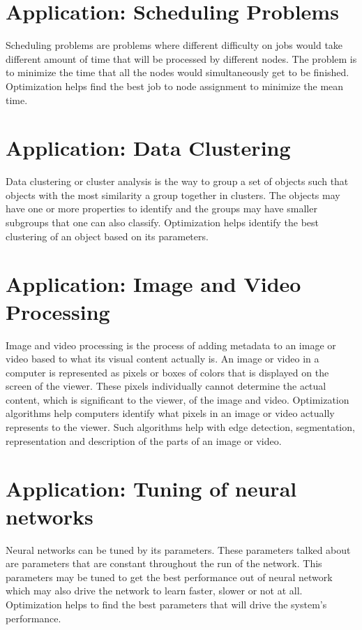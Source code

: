 \section{Application: Scheduling Problems}
Scheduling problems are problems where different difficulty on jobs would take different amount of time that will be processed by different nodes. The problem is to minimize the time that all the nodes would simultaneously get to be finished. Optimization helps find the best job to node assignment to minimize the mean time.

\section{Application: Data Clustering}
Data clustering or cluster analysis is the way to group a set of objects such that objects with the most similarity a group together in clusters. The objects may have one or more properties to identify and the groups may have smaller subgroups that one can also classify. Optimization helps identify the best clustering of an object based on its parameters.

\section{Application: Image and Video Processing}
Image and video processing is the process of adding metadata to an image or video based to what its visual content actually is. An image or video in a computer is represented as pixels or boxes of colors that is displayed on the screen of the viewer. These pixels individually cannot determine the actual content, which is significant to the viewer, of the image and video. Optimization algorithms help computers identify what pixels in an image or video actually represents to the viewer. Such algorithms help with edge detection, segmentation, representation and description of the parts of an image or video.

\section{Application: Tuning of neural networks}
Neural networks can be tuned by its parameters. These parameters talked about are parameters that are constant throughout the run of the network. This parameters may be tuned to get the best performance out of neural network which may also drive the network to learn faster, slower or not at all. Optimization helps to find the best parameters that will drive the system's performance.

